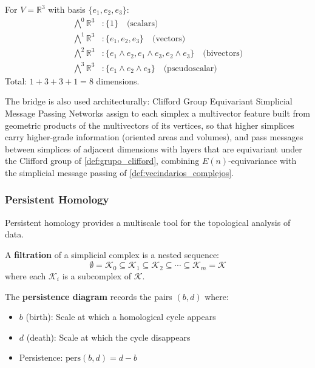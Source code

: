 \begin{example}\label{ex:base_exterior_3d}
For $V = \mathbb{R}^3$ with basis $\{e_1, e_2, e_3\}$:
\begin{align}
\bigwedge^0 \mathbb{R}^3 &: \{1\} \quad \text{(scalars)} \\
\bigwedge^1 \mathbb{R}^3 &: \{e_1, e_2, e_3\} \quad \text{(vectors)} \\
\bigwedge^2 \mathbb{R}^3 &: \{e_1 \wedge e_2, e_1 \wedge e_3, e_2 \wedge e_3\} \quad \text{(bivectors)} \\
\bigwedge^3 \mathbb{R}^3 &: \{e_1 \wedge e_2 \wedge e_3\} \quad \text{(pseudoscalar)}
\end{align}
Total: $1 + 3 + 3 + 1 = 8$ dimensions.
\end{example}

The bridge is also used architecturally: Clifford Group Equivariant Simplicial Message Passing Networks \citep{liu2024cliffordsimplicial} assign to each simplex a multivector feature built from geometric products of the multivectors of its vertices, so that higher simplices carry higher-grade information (oriented areas and volumes), and pass messages between simplices of adjacent dimensions with layers that are equivariant under the Clifford group of \autoref{def:grupo_clifford}, combining $E(n)$-equivariance with the simplicial message passing of \autoref{def:vecindarios_complejos}.

\subsubsection{Persistent Homology}

Persistent homology provides a multiscale tool for the topological analysis of data.

\begin{definition}[Filtration]\label{def:filtracion_cnn}
A \textbf{filtration} of a simplicial complex is a nested sequence:
\[\emptyset = \mathcal{K}_0 \subseteq \mathcal{K}_1 \subseteq \mathcal{K}_2 \subseteq \cdots \subseteq \mathcal{K}_m = \mathcal{K}\]
where each $\mathcal{K}_i$ is a subcomplex of $\mathcal{K}$.
\end{definition}

\begin{definition}\label{def:diagrama_persistencia_cnn}
The \textbf{persistence diagram} records the pairs $(b, d)$ where:
\begin{itemize}
    \item $b$ (birth): Scale at which a homological cycle appears
    \item $d$ (death): Scale at which the cycle disappears
    \item Persistence: $\text{pers}(b,d) = d - b$
\end{itemize}
\end{definition}

